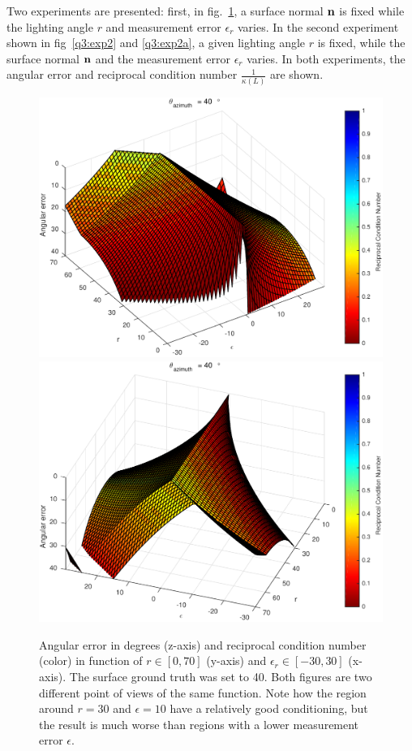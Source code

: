 \documentclass{report}
\begin{document}
Two experiments are presented: first, in fig.~\ref{q3:exp1}, a surface normal $\mathbf{n}$ is fixed while the lighting angle $r$ and measurement error $\epsilon_r$ varies. In the second experiment shown in fig~\ref{q3:exp2} and \ref{q3:exp2a}, a given lighting angle $r$ is fixed, while the surface normal $\mathbf{n}$ and the measurement error $\epsilon_r$ varies. In both experiments, the angular error and reciprocal condition number $\frac{1}{\kappa\left(L\right)}$ are shown.

\begin{figure}
  \centering
  \includegraphics[width=0.45\linewidth]{q3_experiment_1_view_1.pdf}
  \includegraphics[width=0.45\linewidth]{q3_experiment_1_view_2.pdf}
  \caption[Experiment 1]
   {Angular error in degrees (z-axis) and reciprocal condition number (color) in function of $r \in \left[0, 70\right]$ (y-axis) and $\epsilon_r \in \left[-30, 30\right]$ (x-axis). The surface ground truth was set to 40\degree.  Both figures are two different point of views of the same function. Note how the region around $r = 30$ and $\epsilon = 10$ have a relatively good conditioning, but the result is much worse than regions with a lower measurement error $\epsilon$.}
  \label{q3:exp1}
\end{figure}
\end{document}

